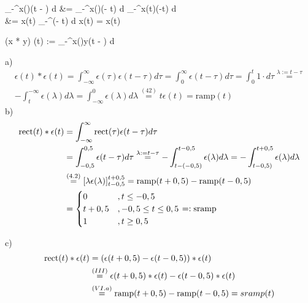 \begin{abox}
	\int_{-\infty}^{\infty}x(\tau)\delta(t  - \tau) d \tau &= 	\int_{-\infty}^{\infty}x(\tau)\delta(\tau - t) d \tau {}	\int_{-\infty}^{\infty}x(t)\delta(\tau -t) d \tau \\
	&= x(t)	\int_{-\infty}^{\infty}\delta(\tau - t) d \tau {} x(t)  = x(t)
\end{abox}

\begin{abox}
	(x * y) (t) := 	\int_{-\infty}^{\infty}x(\tau)y(t  - \tau) d \tau
\end{abox}

\begin{tbox}
	a) \begin{align*}\epsilon(t) * \epsilon(t) = \int_{-\infty}^{\infty}\epsilon(\tau)\epsilon(t  - \tau) d \tau = 
	\int_{0}^{\infty}\epsilon(t  - \tau) d \tau = 	\int_{0}^{t}1 \cdot d\tau \overset{\lambda := t-\tau}{=}\\
	-\int_{t}^{-\infty}\epsilon(\lambda) d \lambda = 
	\int_{-\infty}^{0}\epsilon(\lambda) d \lambda \overset{(42)}{=} t\epsilon(t) = \text{ramp}(t)\end{align*}
	b) \begin{align*}
	\text{rect}(t) * \epsilon(t) &= 	\int_{-\infty}^{\infty}\text{rect}(\tau)\epsilon(t  - \tau) d \tau \\&= 
	\int_{-0,5}^{0,5}\epsilon(t  - \tau) d \tau \overset{\lambda := t-\tau}{=}
	-\int_{t-(-0,5)}^{t-0,5}\epsilon(\lambda) d \lambda = 
	-\int_{t-0,5)}^{t+0,5}\epsilon(\lambda) d \lambda\\ &\overset{(4.2)}{=}[\lambda\epsilon(\lambda)]_{t-0,5}^{t+0,5}
	= \text{ramp}(t+0,5) - \text{ramp}(t-0,5)\\
	&= \begin{cases}
	0 &, t \leq -0,5\\
	t+0,5 &, -0,5 \leq t \leq 0,5\\
	1 &, t \geq 0,5
	\end{cases} =: \text{sramp}
	\end{align*}
\end{tbox}

\begin{tbox}
	c) \begin{align*}
	\text{rect}(t) * \epsilon(t) &= (\epsilon(t+0,5) - \epsilon(t-0,5)) * \epsilon(t)\\
	&\overset{(III)}{=}\epsilon(t +0,5) * \epsilon(t) - \epsilon(t-0,5) * \epsilon(t)\\
	&\overset{(VI.a)}{=} \text{ramp}(t + 0,5) - \text{ramp}( t - 0,5) = sramp(t)
	\end{align*}
\end{tbox}

